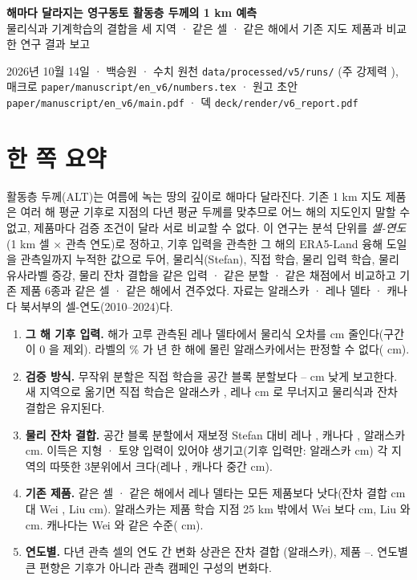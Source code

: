 \documentclass[10pt]{article}
\begin{document}
{\headfont\cjkhead\LARGE\bfseries 해마다 달라지는 영구동토 활동층 두께의 1 km 예측}\\[0.3em]
{\large 물리식과 기계학습의 결합을 세 지역 · 같은 셀 · 같은 해에서 기존 지도 제품과 비교한 연구 결과 보고}\\[0.2em]
\parbox{\textwidth}{\raggedright 2026년 10월 14일 · 백승원 · 수치 원천 \texttt{data/processed/v5/runs/\nrunTag} (주 강제력 \texttt{\nforcingMain}), 매크로 \texttt{paper/manuscript/en\_v6/numbers.tex} · 원고 초안 \texttt{paper/manuscript/en\_v6/main.pdf} · 덱 \texttt{deck/render/v6\_report.pdf}}

\section{한 쪽 요약}
활동층 두께(ALT)는 여름에 녹는 땅의 깊이로 해마다 달라진다. 기존 1 km 지도 제품은 여러 해 평균 기후로 지점의 다년 평균 두께를 맞추므로 어느 해의 지도인지 말할 수 없고, 제품마다 검증 조건이 달라 서로 비교할 수 없다. 이 연구는 분석 단위를 \emph{셀-연도}(1 km 셀 × 관측 연도)로 정하고, 기후 입력을 관측한 그 해의 ERA5-Land 융해 도일을 관측일까지 누적한 값으로 두어, 물리식(Stefan), 직접 학습, 물리 입력 학습, 물리 유사라벨 증강, 물리 잔차 결합을 같은 입력 · 같은 분할 · 같은 채점에서 비교하고 기존 제품 6종과 같은 셀 · 같은 해에서 견주었다. 자료는 알래스카 · 레나 델타 · 캐나다 북서부의 \nncyAll{} 셀-연도(2010--2024)다.
\begin{enumerate}[leftmargin=1.4em,itemsep=0.1em]
\item \textbf{그 해 기후 입력.} 해가 고루 관측된 레나 델타에서 물리식 오차를 \ndforcLePo{} cm 줄인다(구간이 0 을 제외). 라벨의 \ntopyrshareAk{}\% 가 \ntopyrAk{}년 한 해에 몰린 알래스카에서는 판정할 수 없다(\ndforcAkPo{} cm).
\item \textbf{검증 방식.} 무작위 분할은 직접 학습을 공간 블록 분할보다 \noptimLeDz{}--\noptimCaDz{} cm 낮게 보고한다. 새 지역으로 옮기면 직접 학습은 알래스카 \ndrefAkregDz{}, 레나 \ndrefLeregDz{} cm 로 무너지고 물리식과 잔차 결합은 유지된다.
\item \textbf{물리 잔차 결합.} 공간 블록 분할에서 재보정 Stefan 대비 레나 \ndrefLeblkRo{}, 캐나다 \ndrefCablkRo{}, 알래스카 \ndrefAkblkRo{} cm. 이득은 지형 · 토양 입력이 있어야 생기고(기후 입력만: 알래스카 \ndfeatAkFclim{} cm) 각 지역의 따뜻한 3분위에서 크다(레나 \ndtddLewarm{}, 캐나다 중간 \ndtddCamid{} cm).
\item \textbf{기존 제품.} 같은 셀 · 같은 해에서 레나 델타는 모든 제품보다 낫다(잔차 결합 \nccLeRoall{} cm 대 Wei \nccLeWeiall{}, Liu \nccLeLiuall{} cm). 알래스카는 제품 학습 지점 25 km 밖에서 Wei 보다 \ndprodAkweiRomask{} cm, Liu 와 \ndprodAkliuRomask{} cm. 캐나다는 Wei 와 같은 수준(\ndprodCaweiRomask{} cm).
\item \textbf{연도별.} 다년 관측 셀의 연도 간 변화 상관은 잔차 결합 \nrdeltaAkRo{}(알래스카), 제품 \nrdeltaAkWei{}--\nrdeltaAkLiu{}. 연도별 큰 편향은 기후가 아니라 관측 캠페인 구성의 변화다.
\end{enumerate}
\end{document}

